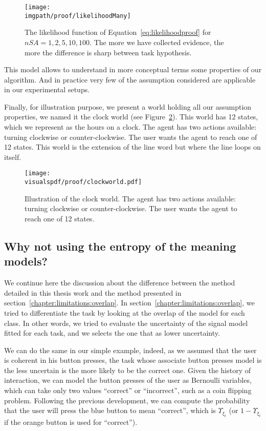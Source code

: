 \begin{figure}[!ht]
\centering
\texttt{[image: \\imgpath/proof/likelihoodMany]}
\caption{The likelihood function of Equation~\ref{eq:likelihoodproof} for $nSA =1,2,5,10,100$. The more we have collected evidence, the more the difference is sharp between task hypothesis.}
\label{fig:prooflikelihoodmany}
\end{figure}

This model allows to understand in more conceptual terms some properties of our algorithm. And in practice very few of the assumption considered are applicable in our experimental setups.

Finally, for illustration purpose, we present a world holding all our assumption properties, we named it the clock world (see Figure~\ref{fig:clockworld}). This world has 12 states, which we represent as the hours on a clock. The agent has two actions available: turning clockwise or counter-clockwise. The user wants the agent to reach one of 12 states. This world is the extension of the line word but where the line loops on itself.

\begin{figure}[!ht]
\centering
\texttt{[image: \\visualspdf/proof/clockworld.pdf]}
\caption{Illustration of the clock world. The agent has two actions available: turning clockwise or counter-clockwise. The user wants the agent to reach one of 12 states.}
\label{fig:clockworld}
\end{figure} 

\subsection{Why not using the entropy of the meaning models?}

We continue here the discussion about the difference between the method detailed in this thesis work and the method presented in section~\ref{chapter:limitations:overlap}. In section~\ref{chapter:limitations:overlap}, we tried to differentiate the task by looking at the overlap of the model for each class. In other words, we tried to evaluate the uncertainty of the signal model fitted for each task, and we selects the one that as lower uncertainty.

We can do the same in our simple example, indeed, as we assumed that the user is coherent in his button presses, the task whose associate button presses model is the less uncertain is the more likely to be the correct one. Given the history of interaction, we can model the button presses of the user as Bernoulli variables, which can take only two values ``correct'' or ``incorrect'', such as a coin flipping problem. Following the previous development, we can compute the probability that the user will press the blue button to mean ``correct'', which is $\Upsilon_{\xi_t}$ (or $1-\Upsilon_{\xi_t}$ if the orange button is used for ``correct'').

